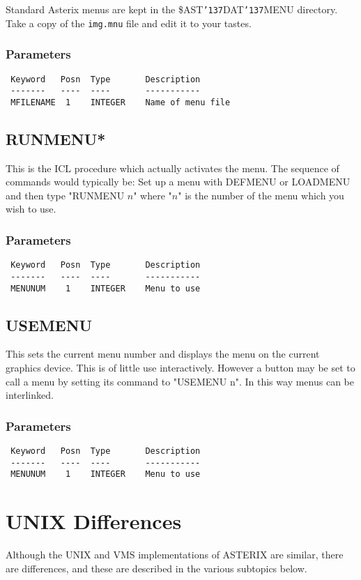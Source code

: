 \documentclass{book}
\renewcommand{\_}{{\tt\char'137}}     %
\begin{document}
Standard Asterix menus are kept in the \$AST\_DAT\_MENU directory.
Take a copy of the {\tt img.mnu} file and edit it to your tastes.

\subsection{Parameters}
\begin{verbatim}
 Keyword   Posn  Type       Description
 -------   ----  ----       -----------
 MFILENAME  1    INTEGER    Name of menu file

\end{verbatim}\section{RUNMENU*}
This is the ICL procedure which actually activates the menu. The
sequence of commands would typically be:
Set up a menu with DEFMENU or LOADMENU and then type "RUNMENU $n$"
where "$n$" is the number of the menu which you wish to use.

\subsection{Parameters}
\begin{verbatim}
 Keyword   Posn  Type       Description
 -------   ----  ----       -----------
 MENUNUM    1    INTEGER    Menu to use

\end{verbatim}\section{USEMENU}
This sets the current menu number and displays the menu on the current
graphics device. This is of little use interactively. However a button
may be set to call a menu by setting its command to "USEMENU n". In this
way menus can be interlinked.

\subsection{Parameters}
\begin{verbatim}
 Keyword   Posn  Type       Description
 -------   ----  ----       -----------
 MENUNUM    1    INTEGER    Menu to use

\end{verbatim}\chapter{UNIX Differences}
Although the UNIX and VMS implementations of ASTERIX are similar,
there are differences, and these are described in the various
subtopics below.
\end{document}
